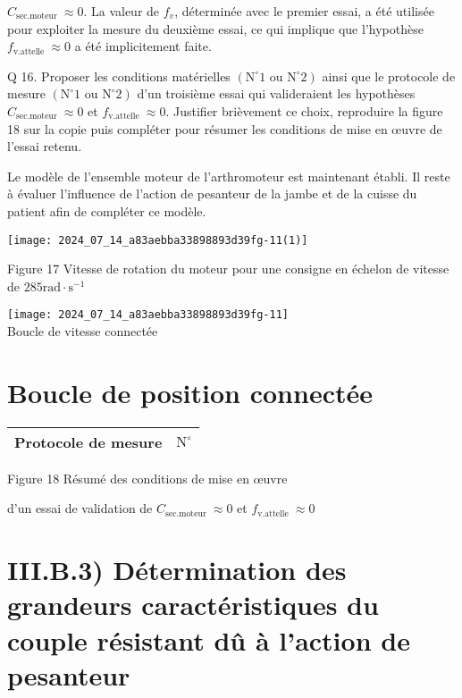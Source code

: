 $C_{\text {sec.moteur }} \approx 0$. La valeur de $f_{v}$, déterminée avec le premier essai, a été utilisée pour exploiter la mesure du deuxième essai, ce qui implique que l'hypothèse $f_{\text {v.attelle }} \approx 0$ a été implicitement faite.

Q 16. Proposer les conditions matérielles $\left(\mathrm{N}^{\circ} 1\right.$ ou $\left.\mathrm{N}^{\circ} 2\right)$ ainsi que le protocole de mesure $\left(\mathrm{N}^{\circ} 1\right.$ ou $\left.\mathrm{N}^{\circ} 2\right)$ d'un troisième essai qui valideraient les hypothèses $C_{\text {sec.moteur }} \approx 0$ et $f_{\text {v.attelle }} \approx 0$. Justifier brièvement ce choix, reproduire la figure 18 sur la copie puis compléter pour résumer les conditions de mise en œuvre de l'essai retenu.

Le modèle de l'ensemble moteur de l'arthromoteur est maintenant établi. Il reste à évaluer l'influence de l'action de pesanteur de la jambe et de la cuisse du patient afin de compléter ce modèle.

\begin{center}
\texttt{[image: 2024\_07\_14\_a83aebba33898893d39fg-11(1)]}
\end{center}

Figure 17 Vitesse de rotation du moteur pour une consigne en échelon de vitesse de $285 \mathrm{rad} \cdot \mathrm{s}^{-1}$

\texttt{[image: 2024\_07\_14\_a83aebba33898893d39fg-11]}$\qquad$\\
Boucle de vitesse connectée

\section*{Boucle de position connectée}
\begin{center}
\begin{tabular}{|l|l}
\hline
Protocole de mesure & $\mathrm{N}^{\circ}$ \\
\hline
\end{tabular}
\end{center}

Figure 18 Résumé des conditions de mise en œuvre

d'un essai de validation de $C_{\text {sec.moteur }} \approx 0$ et $f_{\text {v.attelle }} \approx 0$

\section*{III.B.3) Détermination des grandeurs caractéristiques du couple résistant dû à l'action de pesanteur}
